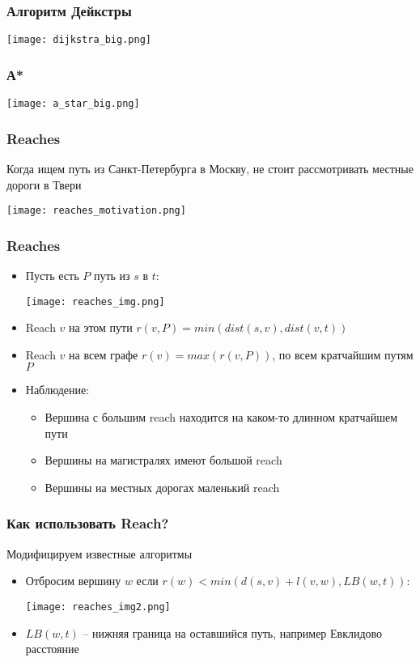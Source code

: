 \documentclass[10pt, pdf,utf8,russian]{beamer}
\begin{document}
\begin{frame}
\frametitle{Алгоритм Дейкстры}
\begin{center}
	\texttt{[image: dijkstra\_big.png]}
\end{center} 
\end{frame}

\begin{frame}
\frametitle{А*}
\begin{center}
	\texttt{[image: a\_star\_big.png]}
\end{center} 
\end{frame}

\begin{frame}
\frametitle{Reaches}
Когда ищем путь из Санкт-Петербурга в Москву, не стоит рассмотривать местные дороги в Твери
\begin{center}
	\texttt{[image: reaches\_motivation.png]}
\end{center} 
\end{frame}

\begin{frame}
\frametitle{Reaches}
\begin{itemize}
	\item 
		Пусть есть $P$ путь из $s$ в $t$:
		\begin{center}
		\texttt{[image: reaches\_img.png]}
		\end{center}
	\item Reach $v$ на этом пути $r(v,P) = min(dist(s,v), dist(v,t))$
	\item Reach $v$ на всем графе $r(v) = max(r(v,P))$, по всем кратчайшим путям $P$
	\item Наблюдение:
		\begin{itemize}
			\item Вершина с большим reach находится на каком-то длинном кратчайшем пути
			\item Вершины на магистралях имеют большой reach
			\item Вершины на местных дорогах маленький reach
		\end{itemize}
\end{itemize}
\end{frame}

\begin{frame}
\frametitle{Как использовать Reach?}
Модифицируем известные алгоритмы
\begin{itemize}
	\item 
		Отбросим вершину $w$ если $r(w)<min(d(s,v)+l(v,w),LB(w,t))$:
		\begin{center}
		\texttt{[image: reaches\_img2.png]}
		\end{center}
	\item 
		$LB(w,t)$ -- нижняя граница на оставшийся путь, например Евклидово расстояние
\end{itemize}
\end{frame}
\end{document}
